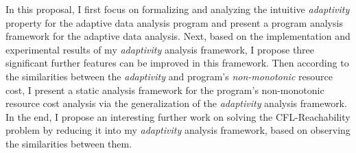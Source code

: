  In this proposal, I first focus on formalizing and analyzing the intuitive \emph{adaptivity} property for 
 the adaptive data analysis program
 and present 
 a program analysis framework for the adaptive data analysis.
 Next, based on the implementation and experimental results of my \emph{adaptivity} analysis framework, 
 I propose three significant 
 further features can be improved in this framework.
Then according to the similarities between the \emph{adaptivity} and program's \emph{non-monotonic} resource cost,
I present 
a static analysis framework for the program's {non-monotonic} resource cost analysis via
the generalization of the \emph{adaptivity} analysis framework.
%
In the end, 
I propose an interesting further work on solving the 
CFL-Reachability problem by reducing it into my \emph{adaptivity} analysis framework, 
based on observing the similarities between them.
